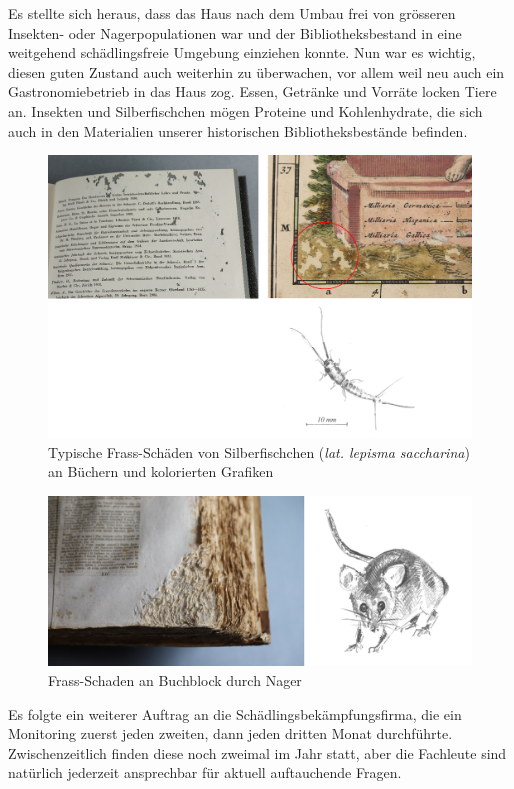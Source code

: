 \documentclass[a4paper,
fontsize=11pt,
oneside,
numbers=noperiodatend,
parskip=half-,
bibliography=totoc,
final
]{scrartcl}
\begin{document}
Es stellte sich heraus, dass das Haus nach dem Umbau frei von grösseren
Insekten- oder Nagerpopulationen war und der Bibliotheksbestand in eine
weitgehend schädlingsfreie Umgebung einziehen konnte. Nun war es
wichtig, diesen guten Zustand auch weiterhin zu überwachen, vor allem
weil neu auch ein Gastronomiebetrieb in das Haus zog. Essen, Getränke
und Vorräte locken Tiere an. Insekten und Silberfischchen mögen Proteine
und Kohlenhydrate, die sich auch in den Materialien unserer historischen
Bibliotheksbestände befinden.

\begin{figure}
\centering
\includegraphics{img/image1.png}
\caption{Typische Frass-Schäden von Silberfischchen
(\emph{lat. lepisma saccharina}) an Büchern und kolorierten Grafiken}
\end{figure}

\begin{figure}
\centering
\includegraphics{img/image2.png}
\caption{Frass-Schaden an Buchblock durch Nager}
\end{figure}

Es folgte ein weiterer Auftrag an die Schädlingsbekämpfungsfirma, die
ein Monitoring zuerst jeden zweiten, dann jeden dritten Monat
durchführte. Zwischenzeitlich finden diese noch zweimal im Jahr statt,
aber die Fachleute sind natürlich jederzeit ansprechbar für aktuell
auftauchende Fragen.
\end{document}
